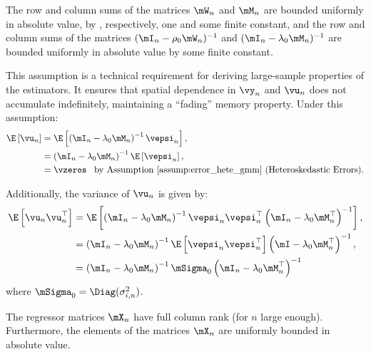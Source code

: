 \begin{assumption}\label{assump:bounded_matrices_hetgmm}
		 The row and column sums of the matrices $\mW_n$ and $\mM_n$ are bounded uniformly in absolute value, by , respectively, one and some finite constant, and the row and column sums of the matrices $(\mI_n - \rho_0\mW_n)^{-1}$ and  $(\mI_n - \lambda_0\mM_n)^{-1}$ are bounded uniformly in absolute value by some finite constant.
\end{assumption}	

This assumption is a technical requirement for deriving large-sample properties of the estimators. It ensures that spatial dependence in $\vy_n$ and $\vu_n$ does not accumulate indefinitely, maintaining a ``fading'' memory property. Under this assumption:
\begin{equation*}
\begin{aligned}
\E\left[\vu_n \right] & = \E\left[\left(\mI_n - \lambda_0 \mM_n\right)^{-1}\vepsi_n\right],  \\
             & = \left(\mI_n - \lambda_0 \mM_n\right)^{-1} \E\left[\vepsi_n\right], \\
             & = \vzeros \;\;\;\mbox{by Assumption \ref{assump:error_hete_gmm} (Heteroskedastic Errors)}.
\end{aligned}
\end{equation*}

Additionally, the variance of $\vu_n$ is given by:
\begin{equation*}
\begin{aligned}
	\E\left[\vu_n\vu^\top_n\right] & = \E\left[\left(\mI_n - \lambda_0 \mM_n\right)^{-1}\vepsi_n\vepsi^\top_n\left(\mI_n - \lambda_0 \mM^\top_n\right)^{-1}\right], \\
	& = \left(\mI_n - \lambda_0\mM_n\right)^{-1}\E\left[\vepsi_n\vepsi^\top_n\right]\left(\mI - \lambda_0 \mM^\top_n\right)^{-1}, \\
	& = \left(\mI_n - \lambda_0 \mM_n\right)^{-1}\mSigma_0\left(\mI_n - \lambda_0\mM^\top_n\right)^{-1}
\end{aligned}
\end{equation*}
%
where $\mSigma_0 = \Diag(\sigma^2_{i,n})$.

\begin{assumption}\label{assump:no_multi_gmmhet}
The regressor matrices $\mX_n$ have full column rank (for $n$ large enough). Furthermore, the elements of the matrices $\mX_n$ are uniformly bounded in absolute value.
\end{assumption}

